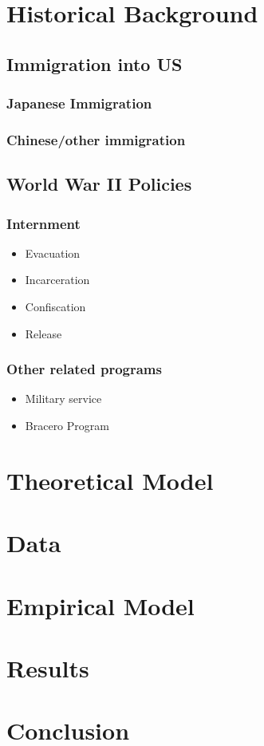 \documentclass[a4paper,11pt]{article}
\begin{document}
\section{Historical Background}
\label{sec:org46d0319}
\subsection{Immigration into US}
\label{sec:org56c03e2}
\subsubsection{Japanese Immigration}
\label{sec:org17eed17}
\subsubsection{Chinese/other immigration}
\label{sec:orga75fafd}
\subsection{World War II Policies}
\label{sec:orgff67cc6}
\subsubsection{Internment}
\label{sec:org38c97c0}
\begin{itemize}
\item Evacuation
\label{sec:orge4756c0}
\item Incarceration
\label{sec:org20c47b3}
\item Confiscation
\label{sec:orgced6a6b}
\item Release
\label{sec:orgfae82a8}
\end{itemize}
\subsubsection{Other related programs}
\label{sec:orgc1de508}
\begin{itemize}
\item Military service
\label{sec:org61c818c}
\item Bracero Program
\label{sec:org1360e02}
\end{itemize}
\section{Theoretical Model}
\label{sec:org32e4139}
\subsection{}
\label{sec:orgbd90c40}

\section{Data}
\label{sec:orge0e6caa}

\section{Empirical Model}
\label{sec:org6810156}

\section{Results}
\label{sec:org32dc177}

\section{Conclusion}
\label{sec:org0eb03e0}
\end{document}
